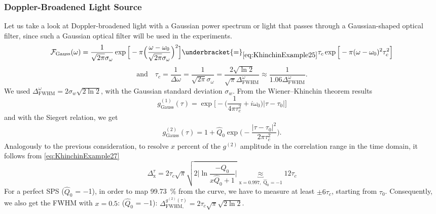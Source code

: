 \subsubsection{Doppler-Broadened Light Source}\label{sec:Doppler}
Let us take a look at Doppler-broadened light with a Gaussian power spectrum or light that passes through a Gaussian-shaped optical filter, since such a Gaussian optical filter will be used in the experiments.
\begin{equation}\label{eq:KhinchinExample24}
	\mathcal{F}_\mathrm{Gauss}(\omega)=\dfrac{1}{\sqrt{2\pi}\sigma_\omega}\exp{\Big[-\pi\Big(\dfrac{\omega-\omega_0}{\sqrt{2\pi}\sigma_\omega}\Big)^2\Big]} \underbracket{=}_{\mathrm{\cref{eq:KhinchinExample25}}}\tau_c\exp{\Big[-\pi(\omega-\omega_0)^2\tau^2_c\Big]}
\end{equation}
\begin{equation}\label{eq:KhinchinExample25}
	\mathrm{and}\quad\tau_c=\dfrac{1}{\Delta\omega}=\dfrac{1}{\sqrt{2\pi}\sigma_\omega}=\dfrac{2\sqrt{\ln{2}}}{\sqrt{\pi}\Delta_\mathrm{FWHM}^\omega}\approx\dfrac{1}{1.06\Delta_\mathrm{FWHM}^\omega}.
\end{equation}
We used $\Delta_\mathrm{FWHM}^\omega=2\sigma_w\sqrt{2\ln{2}}$, with the Gaussian standard deviation $\sigma_w$.
From the Wiener--Khinchin theorem results
\begin{equation}\label{eq:KhinchinExample26}
	g^{(1)}_\mathrm{Gauss}(\tau)=\exp{\Big[-\Big(\dfrac{1}{4\pi\tau^2_c}+i\omega_0\Big)\big|\tau-\tau_0\big|\Big]}
\end{equation}
and with the Siegert relation, we get
\begin{equation}\label{eq:KhinchinExample27}
	g^{(2)}_\mathrm{Gauss}(\tau) = 1 + \hat{Q}_0\exp\Big(-\dfrac{|\tau-\tau_0|^2}{2\pi \tau^2_c}\Big).
\end{equation}
Analogously to the previous consideration, to resolve $x$ percent of the $g^{(2)}$ amplitude in the correlation range in the time domain, it follows from \cref{eq:KhinchinExample27}
\begin{equation}\label{eq:FWHMtauGauss}
	\Delta_\mathrm{x}^\tau=2\tau_c\sqrt{\pi}\sqrt{2\Big|\ln{\dfrac{-\hat{Q}_0}{x\hat{Q}_0+1}}\Big|}\underbracket{\approx}_{\mathrm{x=0.997,\;\hat{Q}_0=-1}}12\tau_c
\end{equation}
For a perfect \ac{SPS} ($\hat{Q}_0$ = \num{-1}), in order to map \SI{99.73}{\percent} from the curve, we have to measure at least $\pm6\tau_c$, starting from $\tau_0$.
Consequently, we also get the \ac{FWHM} with $x=0.5$: ($\hat{Q}_0$ = \num{-1}): $\Delta_\mathrm{FWHM,}^{g^{(2)}(\tau)}=2\tau_c\sqrt{\pi}\sqrt{2\ln{2}}$.


